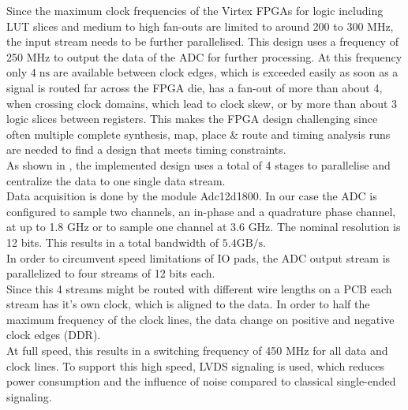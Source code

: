 Since the maximum clock frequencies of the Virtex \glspl{FPGA} for logic
including \gls{LUT} slices and medium to high fan-outs
are limited to around 200 to 300 MHz, the input stream needs to be further
parallelised. This design uses a frequency of 250 MHz to output
the data of the \gls{ADC} for further processing. At this frequency
only $4\;\text{ns}$ are available between clock edges, which is exceeded
easily as soon as a signal is routed far across the \gls{FPGA} die,
has a fan-out of more than about 4, when crossing clock domains, which lead
to clock skew, or by more than about 3 logic slices between registers.
This makes the \gls{FPGA} design challenging since often multiple
complete synthesis, map, place \& route and timing analysis runs are
needed to find a design that meets timing constraints. \\

As shown in , the implemented design uses
a total of 4 stages to parallelise and centralize the data to
one single data stream. \\

Data acquisition is done by the module Adc12d1800. In our case the ADC is
configured to sample two channels, an in-phase and a quadrature phase channel,
at up to 1.8 GHz or to sample one channel at 3.6 GHz.
The nominal resolution is 12 bits. This results in a total bandwidth of
$5.4 \text{GB}/\text{s}$. \\
In order to circumvent speed limitations of \gls{IO} pads,
the \gls{ADC} output stream is parallelized to four streams of 12 bits each. \\

Since this 4 streams might be routed with different wire lengths on a \gls{PCB}
each stream has it's own clock, which is aligned to the data.
In order to half the maximum frequency of the clock lines,
the data change on positive and negative clock edges (\gls{DDR}). \\

At full speed, this results in a switching frequency of 450 MHz for all data
and clock lines. To support this high speed, \gls{LVDS} signaling is used,
which reduces power consumption and the influence of noise
compared to classical single-ended signaling. \\


